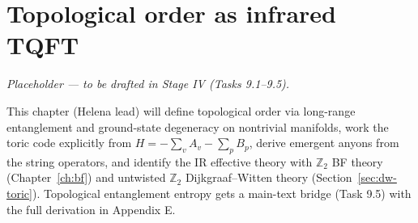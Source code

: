 \chapter{Topological order as infrared TQFT}\label{ch:toporder}

\emph{Placeholder --- to be drafted in Stage IV (Tasks 9.1--9.5).}

This chapter (Helena lead) will define topological order via long-range entanglement and ground-state degeneracy on nontrivial manifolds, work the toric code explicitly from $H = -\sum_v A_v - \sum_p B_p$, derive emergent anyons from the string operators, and identify the IR effective theory with $\mathbb{Z}_2$ BF theory (Chapter~\ref{ch:bf}) and untwisted $\mathbb{Z}_2$ Dijkgraaf--Witten theory (Section~\ref{sec:dw-toric}). Topological entanglement entropy gets a main-text bridge (Task 9.5) with the full derivation in Appendix E.
